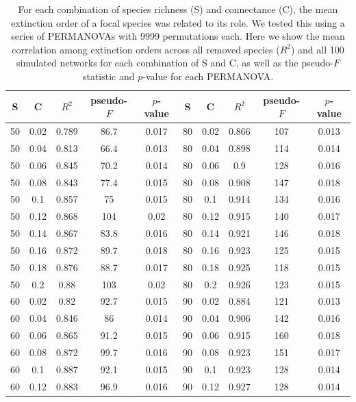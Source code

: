 \documentclass[12pt]{article}
\begin{document}
  \begin{table}[ht!]
    \caption{For each combination of species richness (S) and connectance (C), the mean extinction order of a focal species was related to its role. We tested this using a series of PERMANOVAs with 9999 permutations each. Here we show the mean correlation among extinction orders across all removed species ($R^2$) and all 100 simulated networks for each combination of S and C, as well as the pseudo-$F$ statistic and $p$-value for each PERMANOVA.}
    \label{permtable}
    \begin{tabular}{c c | c | c c ||c c | c | c c |}
      S & C & $R^2$ & pseudo-$F$  & $p$-value & S & C & $R^2$ & pseudo-$F$  & $p$-value\\ 
      \hline
      50  & 0.02  & 0.789 & 86.7  & 0.017 & 80  & 0.02  & 0.866 & 107 & 0.013 \\
      50  & 0.04  & 0.813 & 66.4  & 0.013 & 80  & 0.04  & 0.898 & 114 & 0.014 \\
      50  & 0.06  & 0.845 & 70.2  & 0.014 & 80  & 0.06  & 0.9 & 128 & 0.016 \\
      50  & 0.08  & 0.843 & 77.4  & 0.015 & 80  & 0.08  & 0.908 & 147 & 0.018 \\
      50  & 0.1 & 0.857 & 75  & 0.015 & 80  & 0.1 & 0.914 & 134 & 0.016 \\
      50  & 0.12  & 0.868 & 104 & 0.02  & 80  & 0.12  & 0.915 & 140 & 0.017 \\
      50  & 0.14  & 0.867 & 83.8  & 0.016 & 80  & 0.14  & 0.921 & 146 & 0.018 \\
      50  & 0.16  & 0.872 & 89.7  & 0.018 & 80  & 0.16  & 0.923 & 125 & 0.015 \\
      50  & 0.18  & 0.876 & 88.7  & 0.017 & 80  & 0.18  & 0.925 & 118 & 0.015 \\
      50  & 0.2 & 0.88  & 103 & 0.02  & 80  & 0.2 & 0.926 & 123 & 0.015 \\
      60  & 0.02  & 0.82  & 92.7  & 0.015 & 90  & 0.02  & 0.884 & 121 & 0.013 \\
      60  & 0.04  & 0.846 & 86  & 0.014 & 90  & 0.04  & 0.906 & 142 & 0.016 \\
      60  & 0.06  & 0.865 & 91.2  & 0.015 & 90  & 0.06  & 0.915 & 160 & 0.018 \\
      60  & 0.08  & 0.872 & 99.7  & 0.016 & 90  & 0.08  & 0.923 & 151 & 0.017 \\
      60  & 0.1 & 0.887 & 92.1  & 0.015 & 90  & 0.1 & 0.923 & 128 & 0.014 \\
      60  & 0.12  & 0.883 & 96.9  & 0.016 & 90  & 0.12  & 0.927 & 128 & 0.014 \\

\end{tabular}
\end{table}
\end{document}
